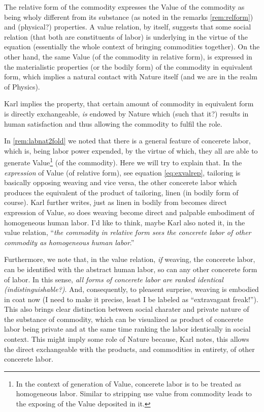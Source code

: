 \documentclass[12pt]{extarticle}
\theoremstyle{definition}
\begin{document}
The relative form of the commodity expresses the Value of the commodity as being wholy different from its substance (as noted in the remarks \ref{rem:relform}) and (physical?) properties.  A value relation, by itself, suggests that some social relation (that both are constituents of labor) is underlying in the virtue of the equation (essentially the whole context of bringing commodities together).  On the other hand, the same Value (of the commodity in relative form), is expressed in the materialistic properties (or the bodily form) of the commodity in equivalent form, which implies a natural contact with Nature itself (and we are in the realm of Physics).

Karl implies the property, that certain amount of commodity in equivalent form is directly exchangeable, \emph{is} endowed by Nature which (such that it?) results in human satisfaction and thus allowing the commodity to fulfil the role.

In \ref{rem:labnat2fold} we noted that there is a general feature of concerete labor, which is, being labor power expended, by the virtue of which, they all are able to generate Value\footnote{In the context of generation of Value, concerete labor is to be treated as homogeneous labor.  Similar to stripping use value from commodity leads to the exposing of the Value deposited in it.} (of the commodity). Here we will try to explain that. In the \emph{expression} of Value (of relative form), see equation \ref{eq:exvalrep}, tailoring is basically opposing weaving and vice versa, the other concerete labor which produces the equivalent of the product of tailoring, linen (in bodily form of course).  Karl further writes, just as linen in bodily from becomes direct expression of Value, so does weaving become direct and palpable embodiment of homogeneous human labor.  I'd like to think, maybe Karl also noted it, in the value relation, ``\emph{the commodity in relative form sees the concerete labor of other commodity as homogeneous human labor}.''

Furthermore, we note that, in the value relation, \emph{if} weaving, the concerete labor, can be identified with the abstract human labor, so can any other concerete form of labor.  In this sense, \emph{all forms of concerete labor are ranked identical (indistinguishable?)}.  And, consequently, to pleasent surprise, weaving is embodied in coat now (I need to make it precise, least I be labeled as ``extravagant freak!'').  This also brings clear distinction between social charater and private nature of the substance of commodity, which can be visualized as product of concerete labor being private and at the same time ranking the labor identically in social context.  This might imply some role of Nature because, Karl notes, this allows the direct exchangeable with the products, and commodities in entirety, of other concerete labor.
\end{document}
